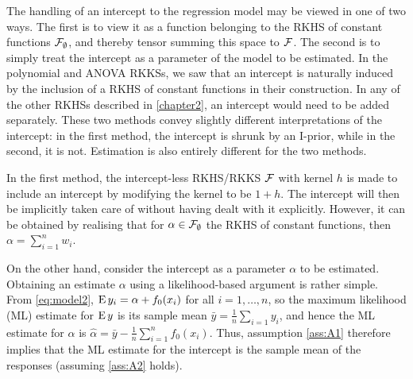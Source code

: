 The handling of an intercept to the regression model may be viewed in one of two ways.
The first is to view it as a function belonging to the RKHS of constant functions ${\mathcal F}_\emptyset$, and thereby tensor summing this space to ${\mathcal F}$.
The second is to simply treat the intercept as a parameter of the model to be estimated.
In the polynomial and ANOVA RKKSs, we saw that an intercept is naturally induced by the inclusion of a RKHS of constant functions in their construction.
In any of the other RKHSs described in \cref{chapter2}, an intercept would need to be added separately.
These two methods convey slightly different interpretations of the intercept: in the first method, the intercept is shrunk by an I-prior, while in the second, it is not.
Estimation is also entirely different for the two methods.

In the first method, the intercept-less RKHS/RKKS ${\mathcal F}$ with kernel $h$ is made to include an intercept by modifying the kernel to be $1 + h$.
The intercept will then be implicitly taken care of without having dealt with it explicitly.
However, it can be obtained by realising that for $\alpha\in{\mathcal F}_\emptyset$ the RKHS of constant functions, then $\alpha = \sum_{i=1}^n w_i$.

On the other hand, consider the intercept as a parameter $\alpha$ to be estimated.
Obtaining an estimate $\alpha$ using a likelihood-based argument is rather simple.
From \cref{eq:model2}, $\operatorname{E} y_i = \alpha + f_0(x_i)$ for all $i=1,\dots,n$, so the maximum likelihood (ML) estimate for $\operatorname{E} y$ is its sample mean $\bar y = \frac{1}{n}\sum_{i=1} y_i$, and hence the ML estimate for $\alpha$ is $\hat\alpha = \bar y - \frac{1}{n} \sum_{i=1}^n f_0(x_i)$.
Thus, assumption \ref{ass:A1} therefore implies that the ML estimate for the intercept is the sample mean of the responses (assuming \ref{ass:A2} holds).


